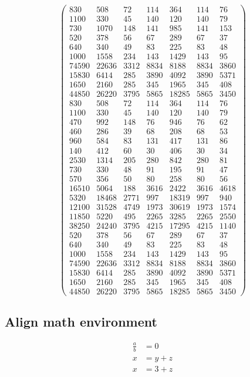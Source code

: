 \documentclass{article}%
\begin{document}
\[\begin{pmatrix}
830&508&72&114&364&114&76\\%
1100&330&45&140&120&140&79\\%
730&1070&148&141&985&141&153\\%
520&378&56&67&289&67&37\\%
640&340&49&83&225&83&48\\%
1000&1558&234&143&1429&143&95\\%
74590&22636&3312&8834&8188&8834&3860\\%
15830&6414&285&3890&4092&3890&5371\\%
1650&2160&285&345&1965&345&408\\%
44850&26220&3795&5865&18285&5865&3450\\%
830&508&72&114&364&114&76\\%
1100&330&45&140&120&140&79\\%
470&992&148&76&946&76&62\\%
460&286&39&68&208&68&53\\%
960&584&83&131&417&131&86\\%
140&412&60&30&406&30&34\\%
2530&1314&205&280&842&280&81\\%
730&330&48&91&195&91&47\\%
570&356&50&80&258&80&56\\%
16510&5064&188&3616&2422&3616&4618\\%
5320&18468&2771&997&18319&997&940\\%
12100&31528&4749&1973&30619&1973&1574\\%
11850&5220&495&2265&3285&2265&2550\\%
38250&24240&3795&4215&17295&4215&1140\\%
520&378&56&67&289&67&37\\%
640&340&49&83&225&83&48\\%
1000&1558&234&143&1429&143&95\\%
74590&22636&3312&8834&8188&8834&3860\\%
15830&6414&285&3890&4092&3890&5371\\%
1650&2160&285&345&1965&345&408\\%
44850&26220&3795&5865&18285&5865&3450%
\end{pmatrix}%
\]

%
\subsection{Align math environment}%
\label{subsec:Alignmathenvironment}%
\begin{align}%
\frac{a}{b} &= 0 \\%
x &= y + z \\%
x &= 3 + z%
\end{align}
\end{document}
